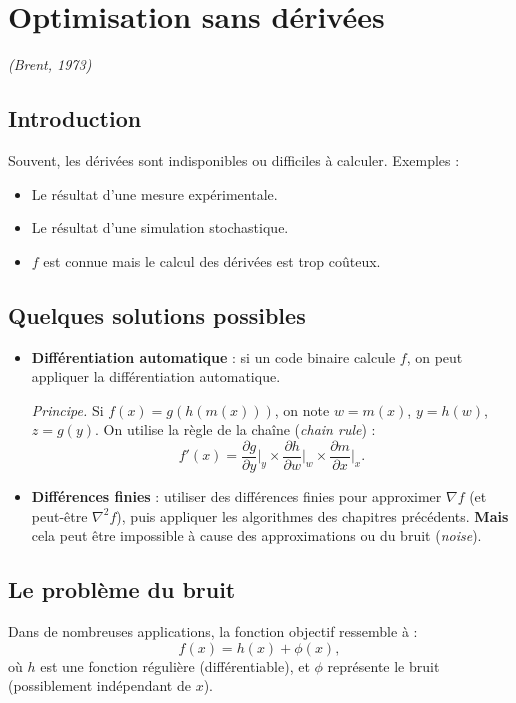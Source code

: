 \chapter{Optimisation sans dérivées}
\label{chap:derivative-free}
\textit{(Brent, 1973)}

\section{Introduction}

Souvent, les dérivées sont indisponibles ou difficiles à calculer.
Exemples :
\begin{itemize}
    \item Le résultat d'une mesure expérimentale.
    \item Le résultat d'une simulation stochastique.
    \item $f$ est connue mais le calcul des dérivées est trop coûteux.
\end{itemize}

\section{Quelques solutions possibles}

\begin{itemize}
    \item \textbf{Différentiation automatique} : si un code binaire calcule $f$, on peut appliquer la différentiation automatique.
    
    \textit{Principe.} Si $f(x) = g(h(m(x)))$, on note $w = m(x)$, $y = h(w)$, $z = g(y)$.
    On utilise la règle de la chaîne (\textit{chain rule}) :
    \[
        f'(x) = \frac{\partial g}{\partial y} \bigg|_y \times \frac{\partial h}{\partial w} \bigg|_w \times \frac{\partial m}{\partial x} \bigg|_x.
    \]

    \item \textbf{Différences finies} : utiliser des différences finies pour approximer $\nabla f$ (et peut-être $\nabla^2 f$), puis appliquer les algorithmes des chapitres précédents.
    \textbf{Mais} cela peut être impossible à cause des approximations ou du bruit (\textit{noise}).
\end{itemize}

\section{Le problème du bruit}

Dans de nombreuses applications, la fonction objectif ressemble à :
\begin{equation}
    f(x) = h(x) + \phi(x),
\end{equation}
où $h$ est une fonction régulière (différentiable), et $\phi$ représente le bruit (possiblement indépendant de $x$).

